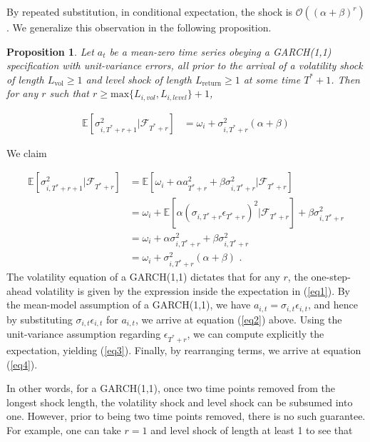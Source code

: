 \documentclass[11pt]{article}
\newtheorem{prop}{Proposition}
\theoremstyle{definition}
\newenvironment{proof-of-proposition}[1][{}]{\noindent{\bf
    Proof of Proposition {#1}}
  \hspace*{.5em}}{\qed\bigskip\\}
\begin{document}
By repeated substitution, in conditional expectation, the shock is $\mathcal{O}((\alpha+\beta)^{r})$.  We generalize this observation in the following proposition.

\begin{prop}
Let $a_{t}$ be a mean-zero time series obeying a GARCH(1,1) specification with unit-variance errors, all prior to the arrival of a volatility shock of length $L_{\text{vol}} \geq 1$ and level shock of length $L_{\text{return}}\geq 1$ at some time $T^{*}+1$.  Then for any $r$ such that $r \geq \text{max}\{L_{i, vol},L_{i, level}\} + 1$, 

\begin{align*}
\mathbb{E}[ \sigma^{2}_{i,T^{*}+r+1} |\mathcal{F}_{T^{*}+r}] & = \omega_{i} + \sigma^{2}_{i,T^{*}+r}(\alpha + \beta)
\end{align*}
\end{prop}

\begin{proof-of-proposition}
We claim

\begin{align}
\mathbb{E}[ \sigma^{2}_{i,T^{*}+r+1} |\mathcal{F}_{T^{*}+r}] & = \mathbb{E}[\omega_{i} + \alpha a_{T^{*}+r}^{2} + \beta\sigma^{2}_{i,T^{*}+r} |\mathcal{F}_{T^{*}+r}] \label{eq1}\\
& = \omega_{i} + \mathbb{E}[\alpha(\sigma_{i,T^{*}+r}\epsilon_{T^{*}+r})^{2} |\mathcal{F}_{T^{*}+r}] + \beta\sigma^{2}_{i,T^{*}+r} \label{eq2}\\
& = \omega_{i} + \alpha\sigma_{i,T^{*}+r}^{2} + \beta\sigma^{2}_{i,T^{*}+r} \label{eq3}\\
& = \omega_{i} + \sigma^{2}_{i,T^{*}+r}(\alpha + \beta) \label{eq4} \text{ .}
\end{align}
The volatility equation of a GARCH(1,1) dictates that for any $r$, the one-step-ahead volatility is given by the expression inside the expectation in (\ref{eq1}).  By the mean-model assumption of a GARCH(1,1), we have $a_{i,t} = \sigma_{i,t}\epsilon_{i,t}$, and hence by substituting $\sigma_{i,t}\epsilon_{i,t}$ for $a_{i,t}$, we arrive at equation (\ref{eq2}) above.  Using the unit-variance assumption regarding $\epsilon_{T^{*}+r}$, we can compute explicitly the expectation, yielding (\ref{eq3}).  Finally, by rearranging terms, we arrive at equation (\ref{eq4}).
\end{proof-of-proposition}
In other words, for a GARCH(1,1), once two time points removed from the longest shock length, the volatility shock and level shock can be subsumed into one.  However, prior to being two time points removed, there is no such guarantee.  For example, one can take $r = 1$ and level shock of length at least 1 to see that 
\end{document}

